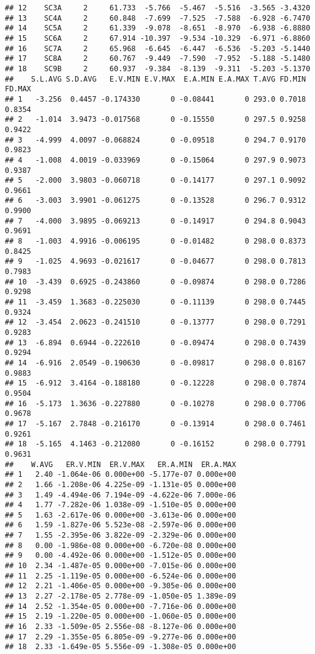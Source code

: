 \documentclass{article}\usepackage[]{graphicx}\usepackage[]{color}
\makeatletter
\newenvironment{kframe}{%
 \def\at@end@of@kframe{}%
 \ifinner\ifhmode%
  \def\at@end@of@kframe{\end{minipage}}%
  \begin{minipage}{\columnwidth}%
 \fi\fi%
 \def\FrameCommand##1{\hskip\@totalleftmargin \hskip-\fboxsep
 \colorbox{shadecolor}{##1}\hskip-\fboxsep
     \hskip-\linewidth \hskip-\@totalleftmargin \hskip\columnwidth}%
 \MakeFramed {\advance\hsize-\width
   \@totalleftmargin\z@ \linewidth\hsize
   \@setminipage}}%
 {\par\unskip\endMakeFramed%
 \at@end@of@kframe}
\newenvironment{knitrout}{}{} %
\makeatother
\begin{document}
\begin{knitrout}
\begin{kframe}
\begin{verbatim}
## 12    SC3A     2     61.733  -5.766  -5.467  -5.516  -3.565 -3.4320
## 13    SC4A     2     60.848  -7.699  -7.525  -7.588  -6.928 -6.7470
## 14    SC5A     2     61.339  -9.078  -8.651  -8.970  -6.938 -6.8880
## 15    SC6A     2     67.914 -10.397  -9.534 -10.329  -6.971 -6.8860
## 16    SC7A     2     65.968  -6.645  -6.447  -6.536  -5.203 -5.1440
## 17    SC8A     2     60.767  -9.449  -7.590  -7.952  -5.188 -5.1480
## 18    SC9B     2     60.937  -9.384  -8.139  -9.311  -5.203 -5.1370
##    S.L.AVG S.D.AVG   E.V.MIN E.V.MAX  E.A.MIN E.A.MAX T.AVG FD.MIN FD.MAX
## 1   -3.256  0.4457 -0.174330       0 -0.08441       0 293.0 0.7018 0.8354
## 2   -1.014  3.9473 -0.017568       0 -0.15550       0 297.5 0.9258 0.9422
## 3   -4.999  4.0097 -0.068824       0 -0.09518       0 294.7 0.9170 0.9823
## 4   -1.008  4.0019 -0.033969       0 -0.15064       0 297.9 0.9073 0.9387
## 5   -2.000  3.9803 -0.060718       0 -0.14177       0 297.1 0.9092 0.9661
## 6   -3.003  3.9901 -0.061275       0 -0.13528       0 296.7 0.9312 0.9900
## 7   -4.000  3.9895 -0.069213       0 -0.14917       0 294.8 0.9043 0.9691
## 8   -1.003  4.9916 -0.006195       0 -0.01482       0 298.0 0.8373 0.8425
## 9   -1.025  4.9693 -0.021617       0 -0.04677       0 298.0 0.7813 0.7983
## 10  -3.439  0.6925 -0.243860       0 -0.09874       0 298.0 0.7286 0.9298
## 11  -3.459  1.3683 -0.225030       0 -0.11139       0 298.0 0.7445 0.9324
## 12  -3.454  2.0623 -0.241510       0 -0.13777       0 298.0 0.7291 0.9283
## 13  -6.894  0.6944 -0.222610       0 -0.09474       0 298.0 0.7439 0.9294
## 14  -6.916  2.0549 -0.190630       0 -0.09817       0 298.0 0.8167 0.9883
## 15  -6.912  3.4164 -0.188180       0 -0.12228       0 298.0 0.7874 0.9504
## 16  -5.173  1.3636 -0.227880       0 -0.10278       0 298.0 0.7706 0.9678
## 17  -5.167  2.7848 -0.216170       0 -0.13914       0 298.0 0.7461 0.9261
## 18  -5.165  4.1463 -0.212080       0 -0.16152       0 298.0 0.7791 0.9631
##    W.AVG   ER.V.MIN  ER.V.MAX   ER.A.MIN  ER.A.MAX
## 1   2.40 -1.064e-06 0.000e+00 -5.177e-07 0.000e+00
## 2   1.66 -1.208e-06 4.225e-09 -1.131e-05 0.000e+00
## 3   1.49 -4.494e-06 7.194e-09 -4.622e-06 7.000e-06
## 4   1.77 -7.282e-06 1.038e-09 -1.510e-05 0.000e+00
## 5   1.63 -2.617e-06 0.000e+00 -3.613e-06 0.000e+00
## 6   1.59 -1.827e-06 5.523e-08 -2.597e-06 0.000e+00
## 7   1.55 -2.395e-06 3.822e-09 -2.329e-06 0.000e+00
## 8   0.00 -1.986e-08 0.000e+00 -6.720e-08 0.000e+00
## 9   0.00 -4.492e-06 0.000e+00 -1.512e-05 0.000e+00
## 10  2.34 -1.487e-05 0.000e+00 -7.015e-06 0.000e+00
## 11  2.25 -1.119e-05 0.000e+00 -6.524e-06 0.000e+00
## 12  2.21 -1.406e-05 0.000e+00 -9.305e-06 0.000e+00
## 13  2.27 -2.178e-05 2.778e-09 -1.050e-05 1.389e-09
## 14  2.52 -1.354e-05 0.000e+00 -7.716e-06 0.000e+00
## 15  2.19 -1.220e-05 0.000e+00 -1.060e-05 0.000e+00
## 16  2.33 -1.509e-05 2.556e-08 -8.127e-06 0.000e+00
## 17  2.29 -1.355e-05 6.805e-09 -9.277e-06 0.000e+00
## 18  2.33 -1.649e-05 5.556e-09 -1.308e-05 0.000e+00
\end{verbatim}
\end{kframe}
\end{knitrout}
\end{document}
